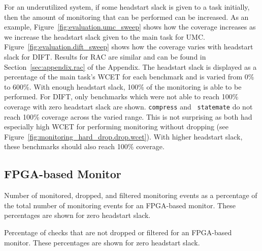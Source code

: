 For an underutilized system, if some headstart slack is given to a task
initially, then the amount of monitoring that can be performed can be
increased. As an example, Figure~\ref{fig:evaluation.umc_sweep} shows how the
coverage increases as we increase the headstart slack given to the main task
for UMC. Figure~\ref{fig:evaluation.dift_sweep} shows how the coverage varies
with headstart slack for DIFT. Results for RAC are similar and can be found in
Section~\ref{sec:appendix.rac} of the Appendix.  The headstart slack is
displayed as a percentage of the main task's WCET for each benchmark and is
varied from 0\% to 600\%. With enough headstart slack, 100\% of the monitoring
is able to be performed. For DIFT, only benchmarks which were not able to reach
100\% coverage with zero headstart slack are shown.  {\tt compress} and {\tt
statemate} do not reach 100\% coverage across the varied range. This is not
surprising as both had especially high WCET for performing monitoring without
dropping (see Figure~\ref{fig:monitoring_hard_drop.drop.wcet}). With higher
headstart slack, these benchmarks should also reach 100\% coverage.

\subsection{FPGA-based Monitor}
\label{sec:monitoring_hard_drop.evaluation.fpga}

\begin{table}[tb]
  \begin{center}
    \caption{Number of monitored, dropped, and filtered monitoring events as a
    percentage of the total number of monitoring events for an FPGA-based
    monitor. These percentages are shown for zero headstart slack.}
    \begin{footnotesize}
    
    \end{footnotesize}
    \label{tab:monitoring_hard_drop.evaluation.zero_slack_flex}
  \end{center}
\end{table}

\begin{table}[tb]
  \begin{center}
    \caption{Percentage of checks that are not dropped or filtered for an
    FPGA-based monitor. These percentages are shown for zero headstart slack.}
    \label{tab:monitoring_hard_drop.evaluation.zero_slack_flex_coverage}
    \begin{footnotesize}
    
    \end{footnotesize}
  \end{center}
\end{table}

